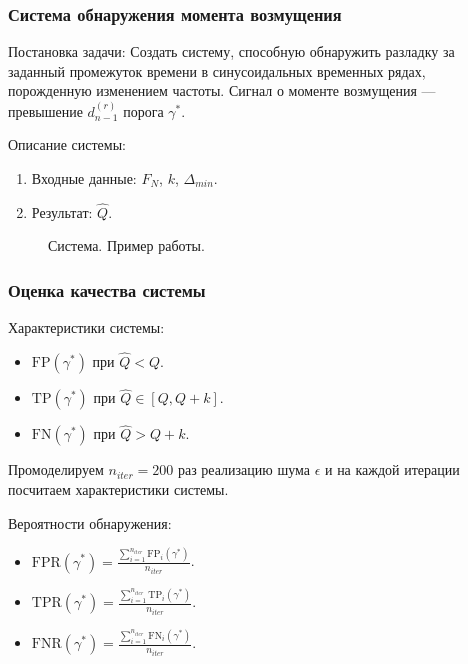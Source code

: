 \documentclass[pdf, 9pt,intlimits, unicode]{beamer}
\begin{document}
	\begin{frame}
		\frametitle{Система обнаружения момента возмущения}
		{\color{blue} Постановка задачи:}
		Создать систему, способную обнаружить разладку за заданный промежуток времени в синусоидальных временных рядах, порожденную изменением частоты. Сигнал о моменте возмущения --- превышение $ d_{n-1}^{(r)} $ порога $ \gamma^* $.
		
		\bigskip
		{\color{blue} Описание системы:}
		\begin{enumerate}
			\item Входные данные: $ F_N $, $ k $, $ \Delta_{min} $.
			\item Результат: $ \hat{Q}$.
		\end{enumerate}
	
		\begin{figure}[!hhh]
			\caption{Система. Пример работы.}
			\label{pic:example_system_work}
		\end{figure}
	\end{frame}
	
	\begin{frame}
		\frametitle{Оценка качества системы}
		{\color{blue} Характеристики системы:}
		\begin{itemize}
			\item $ \mathrm{FP}(\gamma^*) $ при $ \hat{Q} < Q $.
			\item $ \mathrm{TP}(\gamma^*) $ при $ \hat{Q} \in [Q, Q+k] $.
			\item $ \mathrm{FN}(\gamma^*) $ при $ \hat{Q} > Q+k $.
		\end{itemize}
		
		\bigskip 
		Промоделируем $ n_{iter}=200 $ раз реализацию шума $ \epsilon $ и на каждой итерации посчитаем характеристики системы. 
		
		\bigskip
		
		{\color{blue} Вероятности обнаружения:}
		
		\begin{itemize}
			\item  $ \mathrm{FPR}(\gamma^*) = \frac{\sum\limits_{i=1}^{n_{iter}}\mathrm{FP}_i(\gamma^*)}{n_{iter}} $.
			\item $ \mathrm{TPR}(\gamma^*) = \frac{\sum\limits_{i=1}^{n_{iter}}\mathrm{TP}_i(\gamma^*)}{n_{iter}} $.
			\item $ \mathrm{FNR}(\gamma^*) = \frac{\sum\limits_{i=1}^{n_{iter}}\mathrm{FN}_i(\gamma^*)}{n_{iter}} $.
		\end{itemize}
	\end{frame}
\end{document}
